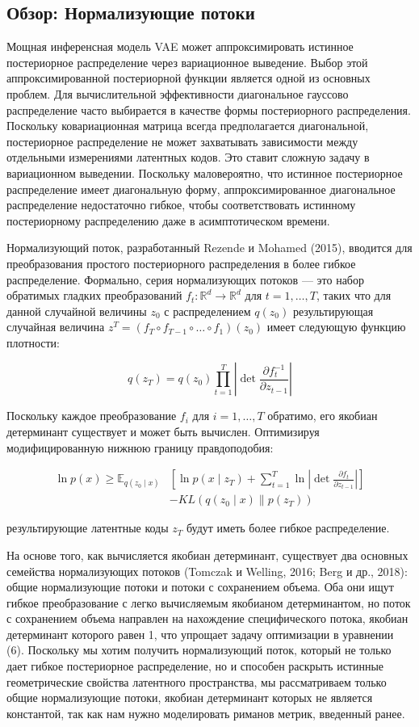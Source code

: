 \documentclass{article}
\begin{document}
\subsection{Обзор: Нормализующие потоки}
Мощная инференсная модель VAE может аппроксимировать истинное постериорное распределение через вариационное выведение. Выбор этой аппроксимированной постериорной функции является одной из основных проблем. Для вычислительной эффективности диагональное гауссово распределение часто выбирается в качестве формы постериорного распределения. Поскольку ковариационная матрица всегда предполагается диагональной, постериорное распределение не может захватывать зависимости между отдельными измерениями латентных кодов. Это ставит сложную задачу в вариационном выведении. Поскольку маловероятно, что истинное постериорное распределение имеет диагональную форму, аппроксимированное диагональное распределение недостаточно гибкое, чтобы соответствовать истинному постериорному распределению даже в асимптотическом времени.

Нормализующий поток, разработанный Rezende и Mohamed (2015), вводится для преобразования простого постериорного распределения в более гибкое распределение. Формально, серия нормализующих потоков — это набор обратимых гладких преобразований \(f_t: \mathbb{R}^d \rightarrow \mathbb{R}^d\) для \(t = 1, \ldots, T\), таких что для данной случайной величины \(z_0\) с распределением \(q(z_0)\) результирующая случайная величина \(z^T = (f_T \circ f_{T-1} \circ \ldots \circ f_1)(z_0)\) имеет следующую функцию плотности:

\[
q(z_T) = q(z_0) \prod_{t=1}^{T} \left| \det \frac{\partial f_t^{-1}}{\partial z_{t-1}} \right|
\]

Поскольку каждое преобразование \(f_i\) для \(i = 1, \ldots, T\) обратимо, его якобиан детерминант существует и может быть вычислен. Оптимизируя модифицированную нижнюю границу правдоподобия:

\[
\begin{aligned}
\ln p(x) \geq \mathbb{E}_{q(z_0 \mid x)} & \left[ \ln p(x \mid z_T) + \sum_{t=1}^{T} \ln \left| \det \frac{\partial f_t}{\partial z_{t-1}} \right| \right] \\
& - KL(q(z_0 \mid x) \| p(z_T))
\end{aligned}
\]

результирующие латентные коды \(z_T\) будут иметь более гибкое распределение.

На основе того, как вычисляется якобиан детерминант, существует два основных семейства нормализующих потоков (Tomczak и Welling, 2016; Berg и др., 2018): общие нормализующие потоки и потоки с сохранением объема. Оба они ищут гибкое преобразование с легко вычисляемым якобианом детерминантом, но поток с сохранением объема направлен на нахождение специфического потока, якобиан детерминант которого равен 1, что упрощает задачу оптимизации в уравнении (6). Поскольку мы хотим получить нормализующий поток, который не только дает гибкое постериорное распределение, но и способен раскрыть истинные геометрические свойства латентного пространства, мы рассматриваем только общие нормализующие потоки, якобиан детерминант которых не является константой, так как нам нужно моделировать риманов метрик, введенный ранее.
\end{document}
